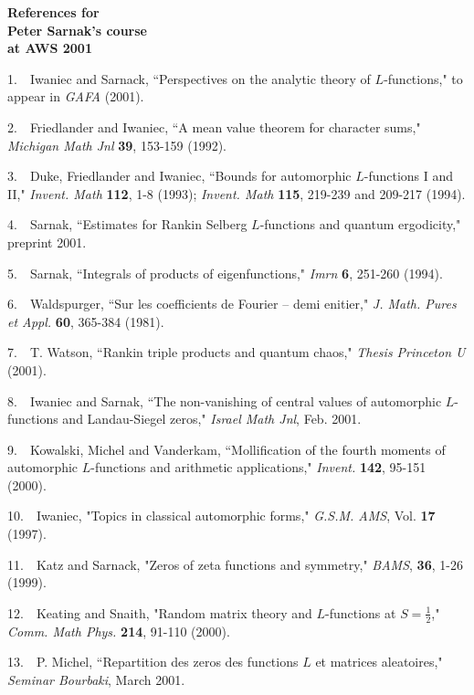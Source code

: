 

\parskip=9pt

\begin{center}
{\Large\bf References for\\Peter Sarnak's course\\at AWS 2001}
\end{center}



1.\ \ Iwaniec and Sarnack, ``Perspectives on the analytic theory
of $L$-functions," to appear in {\it GAFA} (2001).

\bigskip
{}

2.\ \ Friedlander and Iwaniec, ``A mean value theorem for
character sums," {\it Michigan Math Jnl} {\bf 39}, 153-159 (1992).

3.\ \ Duke, Friedlander and Iwaniec, ``Bounds for automorphic
$L$-functions I and II," {\it Invent. Math} {\bf 112}, 1-8 (1993);
{\it Invent. Math} {\bf 115}, 219-239 and 209-217 (1994).

4.\ \ Sarnak, ``Estimates for Rankin Selberg $L$-functions and
quantum ergodicity," preprint 2001.

5.\ \ Sarnak, ``Integrals of products of eigenfunctions," {\it
Imrn} {\bf 6}, 251-260 (1994).

\bigskip
{}

6.\ \ Waldspurger, ``Sur les coefficients de Fourier -- demi
enitier," {\it J. Math. Pures et Appl.} {\bf 60}, 365-384 (1981).

7.\ \ T. Watson, ``Rankin triple products and quantum chaos," {\it
Thesis Princeton U} (2001).

\bigskip
{}

8.\ \ Iwaniec and Sarnak, ``The non-vanishing of central values of
automorphic $L$-functions and Landau-Siegel zeros," {\it Israel
Math Jnl}, Feb. 2001.

9.\ \ Kowalski, Michel and Vanderkam, ``Mollification of the
fourth moments of automorphic $L$-functions and arithmetic
applications," {\it Invent.} {\bf 142}, 95-151 (2000).

\bigskip
{}

10.\ \ Iwaniec, "Topics in classical automorphic forms," {\it
G.S.M. AMS}, Vol. {\bf 17} (1997).

\bigskip
{}

11.\ \ Katz and Sarnack, "Zeros of zeta functions and symmetry,"
{\it BAMS}, {\bf 36}, 1-26 (1999).

12.\ \ Keating and Snaith, "Random matrix theory and $L$-functions
at $S=\frac12$," {\it Comm. Math Phys.} {\bf 214}, 91-110 (2000).

13.\ \ P. Michel, ``Repartition des zeros des functions $L$ et
matrices aleatoires," {\it Seminar Bourbaki\/}, March 2001.





